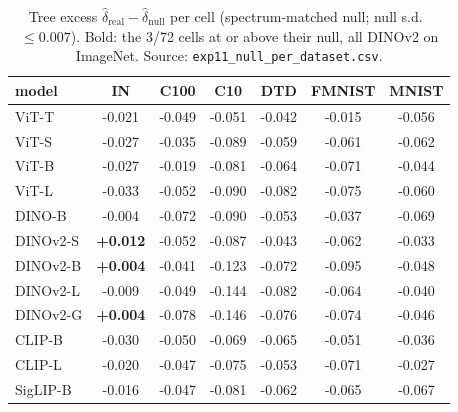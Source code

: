 \begin{table}[H]
\centering
\small
\begin{tabular}{lcccccc}
\toprule
model & IN & C100 & C10 & DTD & FMNIST & MNIST \\
\midrule
ViT-T & -0.021 & -0.049 & -0.051 & -0.042 & -0.015 & -0.056 \\
ViT-S & -0.027 & -0.035 & -0.089 & -0.059 & -0.061 & -0.062 \\
ViT-B & -0.027 & -0.019 & -0.081 & -0.064 & -0.071 & -0.044 \\
ViT-L & -0.033 & -0.052 & -0.090 & -0.082 & -0.075 & -0.060 \\
DINO-B & -0.004 & -0.072 & -0.090 & -0.053 & -0.037 & -0.069 \\
DINOv2-S & \textbf{+0.012} & -0.052 & -0.087 & -0.043 & -0.062 & -0.033 \\
DINOv2-B & \textbf{+0.004} & -0.041 & -0.123 & -0.072 & -0.095 & -0.048 \\
DINOv2-L & -0.009 & -0.049 & -0.144 & -0.082 & -0.064 & -0.040 \\
DINOv2-G & \textbf{+0.004} & -0.078 & -0.146 & -0.076 & -0.074 & -0.046 \\
CLIP-B & -0.030 & -0.050 & -0.069 & -0.065 & -0.051 & -0.036 \\
CLIP-L & -0.020 & -0.047 & -0.075 & -0.053 & -0.071 & -0.027 \\
SigLIP-B & -0.016 & -0.047 & -0.081 & -0.062 & -0.065 & -0.067 \\
\bottomrule
\end{tabular}
\caption{Tree excess $\hat\delta_{\mathrm{real}}-\hat\delta_{\mathrm{null}}$ per cell (spectrum-matched null; null s.d.\ $\le 0.007$). Bold: the 3/72 cells at or above their null, all DINOv2 on ImageNet. Source: \texttt{exp11\_null\_per\_dataset.csv}.}
\label{tab:a1}
\end{table}
